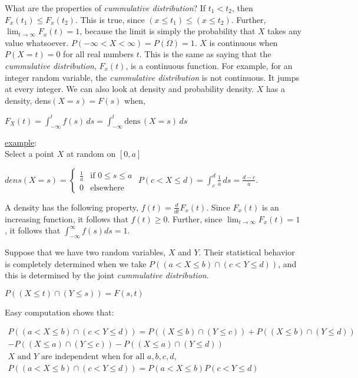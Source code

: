 What are the properties of {\em cummulative distribution}?  If $t_1<t_2$, then $F_x(t_1)\leq F_x(t_2)$.  This is true, since $(x\leq t_1)\leq (x\leq t_2)$.  Further, $\displaystyle \lim_{t\to \infty} F_x(t)=1$, because the limit is simply the probability that $X$ takes any value whatsoever.  $P(-\infty <X< \infty)=P(\Omega)=1$.  $X$ is continuous when $P(X=t)=0$ for all real numbers $t$.  This is the same as saying that the {\em cummulative distribution}, $F_x(t)$, is a continuous function.  For example, for an integer random variable, the {\em cummulative distribution} is not continuous.  It jumps at every integer.  We can also look at density and probability density.  $X$ has a density, dens$(X=s) = F(s)$ when,

$F_X(t)=\int_{-\infty}^{t}\!\!\!\!\! f(s)\,ds= \int_{-\infty}^{t}\!\!\!\!\! \mbox{dens}\,(\!X\!=\!s)\,ds$

\underline{example}: \\
Select a point $X$ at random on $[0,a]$

$dens(X=s)=\left\{ \begin{array} {ll} \frac{1}{a} &\mbox{if $0 \leq s \leq a$} \\ 0 &\mbox{elsewhere}\end{array} \right.$
$P(c < X\leq d)=\displaystyle\int_c^d \!\frac{1}{a}\, ds=\frac{d-c}{a}$.

A density has the following property, $f(t)=\frac{d}{dt}F_x(t)$.  Since $F_x(t)$ is an increasing function, it follows that $f(t)\geq 0$.  Further, since $\displaystyle\lim_{t \to \infty} F_x(t)=1$, it follows that $\displaystyle\int_{-\infty}^{\infty}\!\!\!f(s)ds=1$.

Suppose that we have two random variables, $X$ and $Y$.  Their statistical behavior is completely determined when we take $P((a<X\leq b)\cap(c<Y\leq d))$, and this is determined by the joint {\em cummulative distribution}.

$P((X\leq t)\cap(Y\leq s))=F(s,t)$

Easy computation shows that:

\begin{eqnarray*}
P((a<X\leq b)\cap(c<Y\leq d))=P((X\leq b)\cap(Y\leq c))+P((X\leq b)\cap(Y\leq d)) \\
-P((X\leq a)\cap(Y\leq c))-P((X\leq a)\cap(Y\leq d)) \\
\mbox{$X$ and $Y$ are independent when for all $a,b,c,d$,} \\
P((a<X\leq b)\cap (c<Y\leq d))=P(a<X\leq b)P(c<Y\leq d)
\end{eqnarray*}

